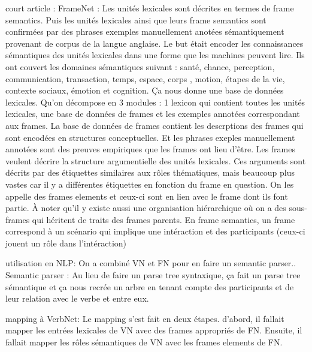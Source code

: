 court article :
FrameNet \citep{BakerBerkeleyFrameNetProject1998}: Les unités lexicales sont décrites en termes de frame semantics. Puis les unités lexicales ainsi que leurs frame semantics sont confirmées par des phrases exemples manuellement anotées sémantiquement provenant de corpus de la langue anglaise. Le but était encoder les connaissances sémantiques des unités lexicales dans une forme que les machines peuvent lire. Ils ont couvert les domaines sémantiques suivant : santé, chance, perception, communication, transaction, temps, espace, corps , motion, étapes de la vie, contexte sociaux, émotion et cognition. Ça nous donne une base de données lexicales. Qu'on décompose en 3 modules : 1 lexicon qui contient toutes les unités lexicales, une base de données de frames et les exemples annotées correspondant aux frames. La base de données de frames contient les descrptions des frames qui sont encodées en structures conceptuelles. Et les phrases exeples manuellement annotées sont des preuves empiriques que les frames ont lieu d'être. Les frames veulent décrire la structure argumentielle des unités lexicales. Ces arguments sont décrits par des étiquettes similaires aux rôles thématiques, mais beaucoup plus vastes car il y a différentes étiquettes en fonction du frame en question. On les appelle des frames elements et ceux-ci sont en lien avec le frame dont ils font partie. À noter qu'il y existe aussi une organisation hiérarchique où on a des sous-frames qui héritent de traits des frames parents. En frame semantics, un frame correspond à un scénario qui implique une intéraction et des participants (ceux-ci jouent un rôle dans l'intéraction)\citep{Shi:2005:PPT:2132047.2132058}

utilisation en NLP: On a combiné VN et FN pour en faire un semantic parser.\citep{Shi:2005:PPT:2132047.2132058}. Semantic parser : Au lieu de faire un parse tree syntaxique, ça fait un parse tree sémantique et ça nous recrée un arbre en tenant compte des participants et de leur relation avec le verbe et entre eux. 

mapping à VerbNet:\citep{Shi:2005:PPT:2132047.2132058} Le mapping s'est fait en deux étapes. d'abord, il fallait mapper les entrées lexicales de VN avec des frames appropriés de FN. Ensuite, il fallait mapper les rôles sémantiques de VN avec les frames elements de FN.

